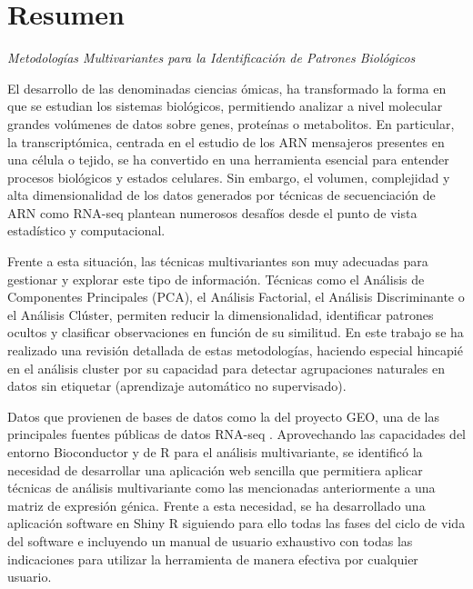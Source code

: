 %

\section*{Resumen}

\begin{center}
\emph{Metodologías Multivariantes para la Identificación de Patrones Biológicos}
\end{center}
\vspace{1cm}

El desarrollo de las denominadas ciencias ómicas, ha transformado la forma en que se estudian los sistemas biológicos, permitiendo analizar 
a nivel molecular grandes volúmenes de datos sobre genes, proteínas o metabolitos. En particular, la transcriptómica, centrada en el estudio 
de los ARN mensajeros presentes en una célula o tejido, se ha convertido en una herramienta esencial para entender procesos biológicos y estados 
celulares. Sin embargo, el volumen, complejidad y alta dimensionalidad de los datos generados por técnicas de secuenciación de ARN como RNA-seq 
plantean numerosos desafíos desde el punto de vista estadístico y computacional. \newline

Frente a esta situación, las técnicas multivariantes son muy adecuadas para gestionar y explorar este tipo de información. Técnicas como el 
Análisis de Componentes Principales (PCA), el Análisis Factorial, el Análisis Discriminante o el Análisis Clúster, permiten reducir la dimensionalidad, 
identificar patrones ocultos y clasificar observaciones en función de su similitud. En este trabajo se ha realizado una revisión detallada de estas 
metodologías, haciendo especial hincapié en el análisis cluster por su capacidad para detectar agrupaciones naturales en datos sin etiquetar 
(aprendizaje automático no supervisado). \newline

Datos que provienen de bases de datos como la del proyecto GEO, una de las principales fuentes públicas de datos RNA-seq . Aprovechando las capacidades 
del entorno Bioconductor y de R para el análisis multivariante, se identificó la necesidad de desarrollar una aplicación web sencilla que permitiera 
aplicar técnicas de análisis multivariante como las mencionadas anteriormente a una matriz de expresión génica. Frente a esta necesidad, se ha desarrollado 
una aplicación software en Shiny R siguiendo para ello todas las fases del ciclo de vida del software e incluyendo un manual de usuario exhaustivo con 
todas las indicaciones para utilizar la herramienta de manera efectiva por cualquier usuario. \newline

